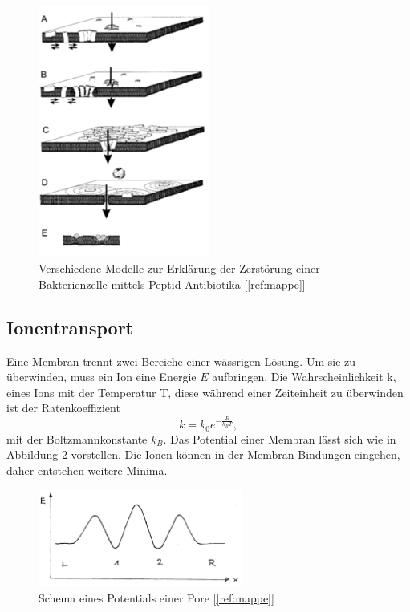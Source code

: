 \documentclass[a4paper,ngerman]{scrartcl}
\begin{document}
\begin{figure}
\includegraphics[width=0.5\textwidth]{abbildungen/wirkmechanismus.png}
\caption{Verschiedene Modelle zur Erklärung der Zerstörung einer Bakterienzelle mittels Peptid-Antibiotika [\ref{ref:mappe}]}
\label{fig:wirkmechanismus}
\end{figure}


\subsection{Ionentransport}

Eine Membran trennt zwei Bereiche einer wässrigen Lösung. Um sie zu überwinden, muss ein Ion eine Energie $E$ aufbringen. Die  Wahrscheinlichkeit k, eines Ions mit der Temperatur T, diese während einer Zeiteinheit zu überwinden ist der Ratenkoeffizient
\begin{equation} \label{eqn:rate}
k = k_0 e^{-\frac{E}{k_B T}},
\end{equation}
mit der Boltzmannkonstante $k_{B}$. Das Potential einer Membran lässt sich wie in Abbildung \ref{fig:potential-einfach} vorstellen. Die Ionen können in der Membran Bindungen eingehen, daher entstehen weitere Minima.

\begin{figure}
\includegraphics[width=0.6\textwidth]{abbildungen/potential-einfach.png}
\caption{Schema eines Potentials einer Pore [\ref{ref:mappe}]}
\label{fig:potential-einfach}
\end{figure}
\end{document}
